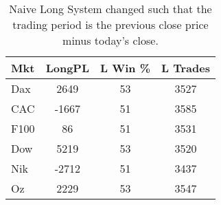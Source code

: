 \begin{table}[ht]
\centering
\caption[Naive Long System - Close to Close]{Naive Long System changed such that the trading period is the previous close price minus today's close.} 
\label{tab:nlng_results_2}
\begin{tabular}{lccc}
  \toprule Mkt & LongPL & L Win \% & L Trades \\ 
  \midrule Dax & 2649 & 53 & 3527 \\ 
  CAC & -1667 & 51 & 3585 \\ 
  F100 & 86 & 51 & 3531 \\ 
  Dow & 5219 & 53 & 3520 \\ 
  Nik & -2712 & 51 & 3437 \\ 
  Oz & 2229 & 53 & 3547 \\ 
   \bottomrule \end{tabular}
\end{table}
